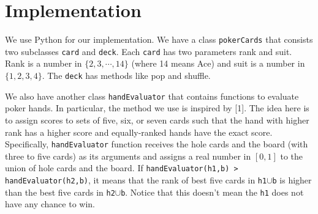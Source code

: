 \section{Implementation}
We use Python for our implementation. We have a class {\tt pokerCards} that consists
two subclasses {\tt card} and {\tt deck}. Each {\tt card} has two parameters rank and suit.
Rank is a number in $\{2,3,\cdots,14\}$ (where 14 means Ace) and suit is a number in 
$\{1,2,3,4\}$. The {\tt deck} has methods like pop and shuffle.

We also have another class {\tt handEvaluator} that contains functions to evaluate poker hands.
In particular, the method we use is inspired by [1]. The idea here is to assign scores to sets of
five, six, or seven cards such that the hand with higher rank has a higher score and equally-ranked
hands have the exact score. Specifically, {\tt handEvaluator} function receives the hole cards and  
the board (with three to five cards) as its arguments and assigns a real number in $[0,1]$
to the union of hole cards and the board. If {\tt handEvaluator(h1,b) > handEvaluator(h2,b)},
it means that the rank of best five cards in {\tt h1$\cup$b} is higher than the best five cards
in {\tt h2$\cup$b}. Notice that this doesn't mean the {\tt h1} does not have any chance to win.
